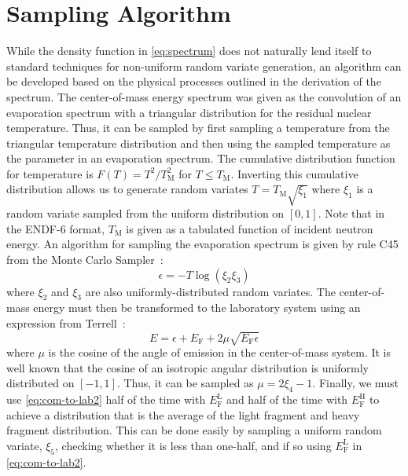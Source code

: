 \documentclass[3p,fleqn]{elsarticle}
\newcommand{\tmax}{T_{\mathrm{M}}}
\newcommand{\ef}{E_{\mathrm{F}}}
\newcommand{\efl}{E_{\mathrm{F}}^{\mathrm{L}}}
\newcommand{\efh}{E_{\mathrm{F}}^{\mathrm{H}}}
\begin{document}
\section{Sampling Algorithm}

While the density function in \autoref{eq:spectrum} does not naturally lend
itself to standard techniques for non-uniform random variate generation, an
algorithm can be developed based on the physical processes outlined in the
derivation of the spectrum. The center-of-mass energy spectrum was given as the
convolution of an evaporation spectrum with a triangular distribution for the
residual nuclear temperature. Thus, it can be sampled by first sampling a
temperature from the triangular temperature distribution and then using the
sampled temperature as the parameter in an evaporation spectrum. The cumulative
distribution function for temperature is $F(T) = T^2/\tmax^2$ for $T \le
\tmax$. Inverting this cumulative distribution allows us to generate random
variates $T = \tmax \sqrt{\xi_1}$ where $\xi_1$ is a random variate sampled from
the uniform distribution on $[0,1]$. Note that in the ENDF-6 format, $\tmax$ is
given as a tabulated function of incident neutron energy. An algorithm for
sampling the evaporation spectrum is given by rule C45 from the Monte Carlo
Sampler~\cite{lanl-everett-1983}:
\begin{equation*}
  \epsilon = -T \log (\xi_2 \xi_3)
\end{equation*}
where $\xi_2$ and $\xi_3$ are also uniformly-distributed random variates. The
center-of-mass energy must then be transformed to the laboratory system using an
expression from Terrell~\cite{physrev-terrell-1959}:
\begin{equation}
  E = \epsilon + \ef + 2\mu \sqrt{\ef \epsilon}
  \label{eq:com-to-lab2}
\end{equation}
where $\mu$ is the cosine of the angle of emission in the center-of-mass
system. It is well known that the cosine of an isotropic angular distribution
is uniformly distributed on $[-1,1]$. Thus, it can be sampled as $\mu = 2\xi_4
- 1$. Finally, we must use \autoref{eq:com-to-lab2} half of the time with
$\efl$ and half of the time with $\efh$ to achieve a distribution that is the
average of the light fragment and heavy fragment distribution. This can be done
easily by sampling a uniform random variate, $\xi_5$, checking whether it is
less than one-half, and if so using $\efl$ in \autoref{eq:com-to-lab2}.
\end{document}
